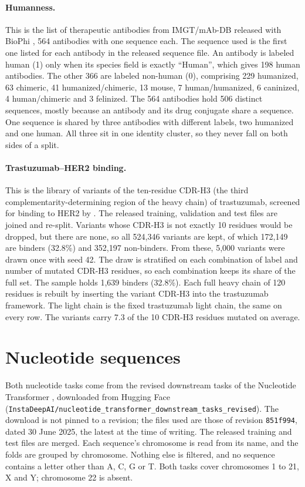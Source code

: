 \paragraph{Humanness.} This is the list of therapeutic antibodies from IMGT/mAb-DB released with BioPhi \citep{Prihoda2022}, 564 antibodies with one sequence each. The sequence used is the first one listed for each antibody in the released sequence file. An antibody is labeled human (1) only when its species field is exactly ``Human'', which gives 198 human antibodies. The other 366 are labeled non-human (0), comprising 229 humanized, 63 chimeric, 41 humanized/chimeric, 13 mouse, 7 human/humanized, 6 caninized, 4 human/chimeric and 3 felinized. The 564 antibodies hold 506 distinct sequences, mostly because an antibody and its drug conjugate share a sequence. One sequence is shared by three antibodies with different labels, two humanized and one human. All three sit in one identity cluster, so they never fall on both sides of a split.

\paragraph{Trastuzumab--HER2 binding.} This is the library of variants of the ten-residue CDR-H3 (the third complementarity-determining region of the heavy chain) of trastuzumab, screened for binding to HER2 by \citet{Chinery2024}. The released training, validation and test files are joined and re-split. Variants whose CDR-H3 is not exactly 10 residues would be dropped, but there are none, so all 524,346 variants are kept, of which 172,149 are binders (32.8\%) and 352,197 non-binders. From these, 5,000 variants were drawn once with seed 42. The draw is stratified on each combination of label and number of mutated CDR-H3 residues, so each combination keeps its share of the full set. The sample holds 1,639 binders (32.8\%). Each full heavy chain of 120 residues is rebuilt by inserting the variant CDR-H3 into the trastuzumab framework. The light chain is the fixed trastuzumab light chain, the same on every row. The variants carry 7.3 of the 10 CDR-H3 residues mutated on average.

\section{Nucleotide sequences}\label{app:datasets:nucleotides}

Both nucleotide tasks come from the revised downstream tasks of the Nucleotide Transformer \citep{DallaTorre2025}, downloaded from Hugging Face (\nolinkurl{InstaDeepAI/nucleotide_transformer_downstream_tasks_revised}). The download is not pinned to a revision; the files used are those of revision \texttt{851f994}, dated 30 June 2025, the latest at the time of writing. The released training and test files are merged. Each sequence's chromosome is read from its name, and the folds are grouped by chromosome. Nothing else is filtered, and no sequence contains a letter other than A, C, G or T. Both tasks cover chromosomes 1 to 21, X and Y; chromosome 22 is absent.

